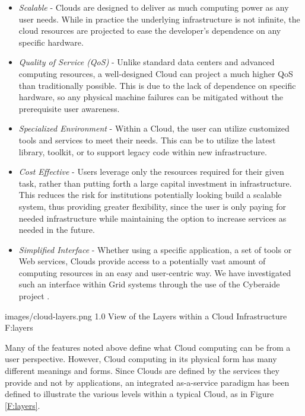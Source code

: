 \begin{itemize}

\item{\em Scalable} - Clouds are designed to deliver as much computing power as any user needs.  While in practice the underlying infrastructure is not infinite, the cloud resources are projected to ease the developer's dependence on any specific hardware.

\item{\em Quality of Service (QoS)} - Unlike standard data centers and advanced computing resources, a well-designed Cloud can project a much higher QoS than traditionally possible.  This is due to the lack of dependence on specific hardware, so any physical machine failures can be mitigated without the prerequisite user awareness.

\item{\em Specialized Environment} - Within a Cloud, the user can utilize customized tools and services to meet their needs. This can be to utilize the latest library, toolkit, or to support legacy code within new infrastructure.  

\item{\em Cost Effective} - Users leverage only the resources required for their given task, rather than putting forth a large capital investment in infrastructure.  This reduces the risk for institutions potentially looking build a scalable system, thus providing greater flexibility, since the user is only paying for needed infrastructure while maintaining the option to increase services as needed in the future.

\item{\em Simplified Interface} - Whether using a specific application, a set of tools or Web services, Clouds provide access to a potentially vast amount of computing resources in an easy and user-centric way. We have investigated such an interface within Grid systems through the use of the Cyberaide project \cite{las09ccgrid, las08javascript}.

\end{itemize}

 {images/cloud-layers.png}
 {1.0}
 {View of the Layers within a Cloud Infrastructure}
 {F:layers}


Many of the features noted above define what Cloud computing can be from a user perspective.  However, Cloud computing in its physical form has many different meanings and forms.  Since Clouds are defined by the services they provide and not by applications, an integrated as-a-service paradigm has been defined to illustrate the various levels within a typical Cloud, as in Figure \ref{F:layers}.





